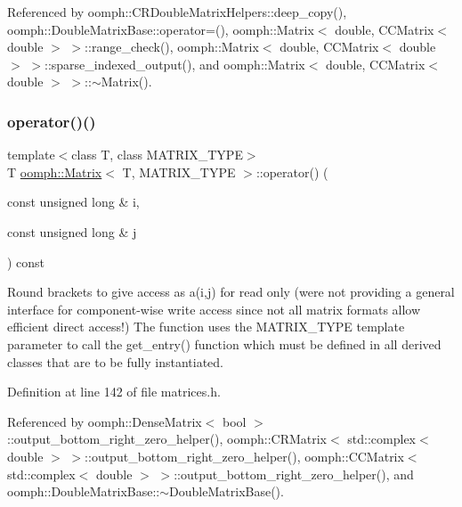 Referenced by oomph\+::\+C\+R\+Double\+Matrix\+Helpers\+::deep\+\_\+copy(), oomph\+::\+Double\+Matrix\+Base\+::operator=(), oomph\+::\+Matrix$<$ double, C\+C\+Matrix$<$ double $>$ $>$\+::range\+\_\+check(), oomph\+::\+Matrix$<$ double, C\+C\+Matrix$<$ double $>$ $>$\+::sparse\+\_\+indexed\+\_\+output(), and oomph\+::\+Matrix$<$ double, C\+C\+Matrix$<$ double $>$ $>$\+::$\sim$\+Matrix().

\mbox{\label{classoomph_1_1Matrix_a26f23d2b331cb7f533fd8585f1ef8d28}} 
\subsubsection{\texorpdfstring{operator()()}{operator()()}\hspace{0.1cm}{\footnotesize\ttfamily [1/2]}}
{\footnotesize\ttfamily template$<$class T, class M\+A\+T\+R\+I\+X\+\_\+\+T\+Y\+PE$>$ \\
T \hyperlink{classoomph_1_1Matrix}{oomph\+::\+Matrix}$<$ T, M\+A\+T\+R\+I\+X\+\_\+\+T\+Y\+PE $>$\+::operator() (\begin{DoxyParamCaption}\item[{const unsigned long \&}]{i,  }\item[{const unsigned long \&}]{j }\end{DoxyParamCaption}) const\hspace{0.3cm}{\ttfamily [inline]}}



Round brackets to give access as a(i,j) for read only (we\textquotesingle{}re not providing a general interface for component-\/wise write access since not all matrix formats allow efficient direct access!) The function uses the M\+A\+T\+R\+I\+X\+\_\+\+T\+Y\+PE template parameter to call the get\+\_\+entry() function which must be defined in all derived classes that are to be fully instantiated. 



Definition at line 142 of file matrices.\+h.



Referenced by oomph\+::\+Dense\+Matrix$<$ bool $>$\+::output\+\_\+bottom\+\_\+right\+\_\+zero\+\_\+helper(), oomph\+::\+C\+R\+Matrix$<$ std\+::complex$<$ double $>$ $>$\+::output\+\_\+bottom\+\_\+right\+\_\+zero\+\_\+helper(), oomph\+::\+C\+C\+Matrix$<$ std\+::complex$<$ double $>$ $>$\+::output\+\_\+bottom\+\_\+right\+\_\+zero\+\_\+helper(), and oomph\+::\+Double\+Matrix\+Base\+::$\sim$\+Double\+Matrix\+Base().

